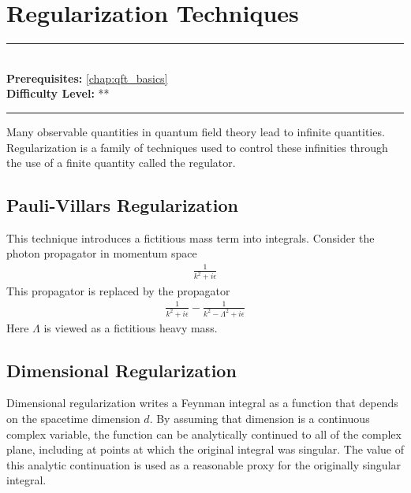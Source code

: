 \documentclass[book.tex]{subfiles}
\begin{document}
\chapter{Regularization Techniques}
\label{chap:qed_calculation}
\noindent\rule{11cm}{0.4pt} \\
\textbf{Prerequisites:} \autoref{chap:qft_basics}  \\
\textbf{Difficulty Level:} ** \\
\noindent\rule{11cm}{0.4pt}
\vspace{5mm}

Many observable quantities in quantum field theory lead to infinite quantities. Regularization is a family of techniques used to control these infinities through the use of a finite quantity called the regulator. 

\section{Pauli-Villars Regularization}

This technique introduces a fictitious mass term into integrals. Consider the photon propagator in momentum space
\begin{align}
    \frac{1}{k^2 + i \epsilon}
\end{align}
This propagator is replaced by the propagator
\begin{align}
    \frac{1}{k^2 + i\epsilon} - \frac{1}{k^2 - \Lambda^2 + i\epsilon}
\end{align}
Here $\Lambda$ is viewed as a fictitious heavy mass.

\section{Dimensional Regularization}

Dimensional regularization writes a Feynman integral as a function that depends on the spacetime dimension $d$. By assuming that dimension is a continuous complex variable, the function can be analytically continued to all of the complex plane, including at points at which the original integral was singular. The value of this analytic continuation is used as a reasonable proxy for the originally singular integral.
\end{document}
